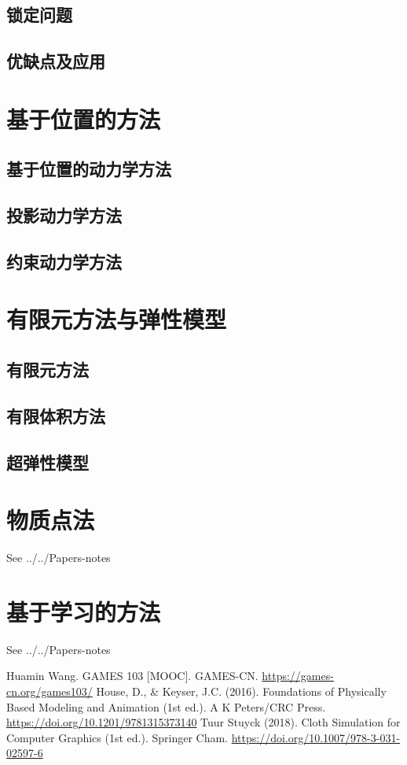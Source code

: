 \documentclass{article}
\begin{document}
\subsection{锁定问题}
\subsection{优缺点及应用}
\section{基于位置的方法}
\subsection{基于位置的动力学方法}
\subsection{投影动力学方法}
\subsection{约束动力学方法}
\section{有限元方法与弹性模型}
\subsection{有限元方法}
\subsection{有限体积方法}
\subsection{超弹性模型}
\section{物质点法}
See ../../Papers-notes
\section{基于学习的方法}
See ../../Papers-notes

\begin{thebibliography}{50}
    Huamin Wang. GAMES 103 [MOOC]. GAMES-CN. \newline \href{https://games-cn.org/games103/}{https://games-cn.org/games103/}
    House, D., \& Keyser, J.C. (2016). Foundations of Physically Based Modeling and Animation (1st ed.). A K Peters/CRC Press. \newline \href{https://doi.org/10.1201/9781315373140}{https://doi.org/10.1201/9781315373140}
    Tuur Stuyck (2018). Cloth Simulation for Computer Graphics (1st ed.). Springer Cham. \newline \href{https://doi.org/10.1007/978-3-031-02597-6}{https://doi.org/10.1007/978-3-031-02597-6}
\end{thebibliography}
\end{document}
